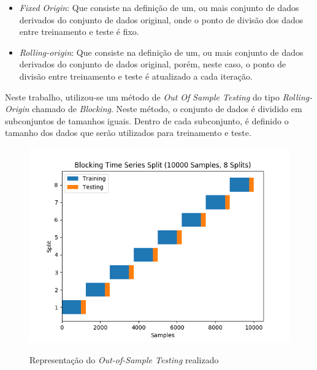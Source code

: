 \begin{itemize}
    \item \textit{Fixed Origin}: Que consiste na definição de um, ou mais conjunto de dados derivados do conjunto de dados original, onde o ponto de divisão dos dados entre treinamento e teste é fixo.
    \item \textit{Rolling-origin}: Que consiste na definição de um, ou mais conjunto de dados derivados do conjunto de dados original, porém, neste caso, o ponto de divisão entre treinamento e teste é atualizado a cada iteração.
\end{itemize}

Neste trabalho, utilizou-se um método de \textit{Out Of Sample Testing} do tipo \textit{Rolling-Origin} chamado de \textit{Blocking}. Neste método, o conjunto de dados é dividido em subconjuntos de tamanhos iguais. Dentro de cada subconjunto, é definido o tamanho dos dados que serão utilizados para treinamento e teste.

\begin{figure}[H]
    \centering
    \includegraphics[scale=0.9]{monography/img/methods/blocking_cv.png}
    \label{figure:blocking}
    \caption[Representação do \textit{Out-of-Sample Testing} realizado]{Representação do \textit{Out-of-Sample Testing} realizado}
\end{figure}